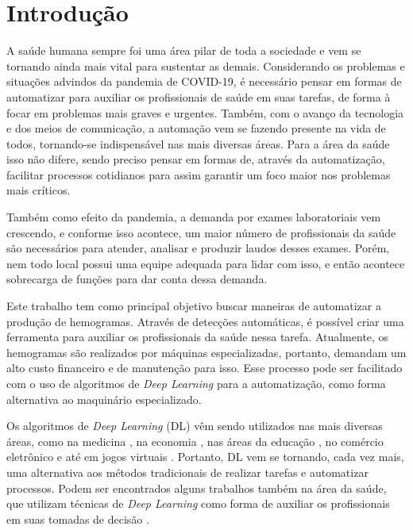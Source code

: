 \chapter{Introdução}
\label{chap:introducao}
A saúde humana sempre foi uma área pilar de toda a sociedade e vem se tornando ainda mais vital para sustentar as demais. Considerando os problemas e situações advindos da pandemia de COVID-19, é necessário pensar em formas de automatizar para auxiliar os profissionais de saúde em suas tarefas, de forma à focar em problemas mais graves e urgentes. Também, com o avanço da tecnologia e dos meios de comunicação, a automação vem se fazendo presente na vida de todos, tornando-se indispensável nas mais diversas áreas. Para a área da saúde isso não difere, sendo preciso pensar em formas de, através da automatização, facilitar processos cotidianos para assim garantir um foco maior nos problemas mais críticos.

Também como efeito da pandemia, a demanda por exames laboratoriais vem crescendo, e conforme isso acontece, um maior número de profissionais da saúde são necessários para atender, analisar e produzir laudos desses exames. Porém, nem todo local possui uma equipe adequada para lidar com isso, e então acontece sobrecarga de funções para dar conta dessa demanda.

Este trabalho tem como principal objetivo buscar maneiras de automatizar a produção de hemogramas. Através de detecções automáticas, é possível criar uma ferramenta para auxiliar os profissionais da saúde nessa tarefa. Atualmente, os hemogramas são realizados por máquinas especializadas, portanto, demandam um alto custo financeiro e de manutenção para isso. Esse processo pode ser facilitado com o uso de algoritmos de \emph{Deep Learning} para a automatização, como forma alternativa ao maquinário especializado.

Os algoritmos de \emph{Deep Learning} (DL) vêm sendo utilizados nas mais diversas áreas, como na medicina \cite{deepLearningMedicine}, na economia \cite{deepLearningEconomy}, nas áreas da educação \cite{deepLearningEducation}, no comércio eletrônico \cite{deepLearningEcommerce} e até em jogos virtuais \cite{deepLearningGaming}. Portanto, DL vem se tornando, cada vez mais, uma alternativa aos métodos tradicionais de realizar tarefas e automatizar processos. Podem ser encontrados alguns trabalhos também na área da saúde, que utilizam técnicas de \emph{Deep Learning} como forma de auxiliar os profissionais em suas tomadas de decisão \cite{deepLearningHealth1, deepLearningHealth2}.

